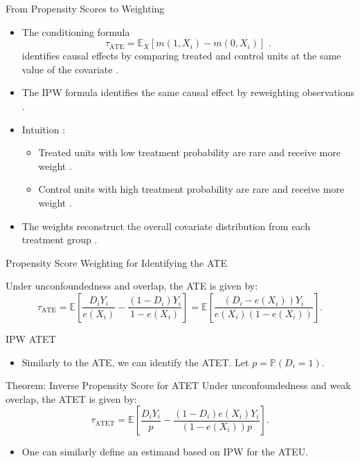 \documentclass[11pt,aspectratio=169]{beamer}
\begin{document}
\begin{frame}{From Propensity Scores to Weighting}

\begin{itemize}
    \item The conditioning formula
    $$\tau_{\text{ATE}} = \mathbb{E}_X[m(1, X_i) - m(0, X_i)] \text{ .}$$
    identifies causal effects by comparing treated and control units at the same value of the covariate .
    \item The IPW formula identifies the same causal effect by reweighting observations .
    \item Intuition :
    \begin{itemize}
        \item[$ \blacksquare $] Treated units with low treatment probability are rare and receive more weight .
        \item[$ \blacksquare $] Control units with high treatment probability are rare and receive more weight .
    \end{itemize}
    \item The weights reconstruct the overall covariate distribution from each treatment group .
\end{itemize}

\end{frame}
\begin{frame}{Propensity Score Weighting for Identifying the ATE}

\begin{theorembox}
Under unconfoundedness and overlap, the ATE is given by:
$$\tau_{\text{ATE}} = \mathbb{E}\left[\frac{D_i Y_i}{e(X_i)} - \frac{(1 - D_i)Y_i}{1 - e(X_i)}\right] = \mathbb{E}\left[\frac{(D_i - e(X_i))Y_i}{e(X_i)(1 - e(X_i))}\right] .$$
\end{theorembox}
\end{frame}

\begin{frame}{IPW ATET}

\begin{itemize}
    \item Similarly to the ATE, we can identify the ATET. Let $p = \mathbb{P}(D_i = 1)$.
\end{itemize}

\begin{theorembox}{Theorem: Inverse Propensity Score for ATET}
Under unconfoundedness and weak overlap, the ATET is given by:
$$\tau_{\text{ATET}} = \mathbb{E}\left[\frac{D_i Y_i}{p} - \frac{(1 - D_i)e(X_i)Y_i}{(1 - e(X_i))p}\right].$$
\end{theorembox}
\begin{itemize}
    \item One can similarly define an estimand based on IPW for the ATEU.
\end{itemize}
\end{frame}
\end{document}
